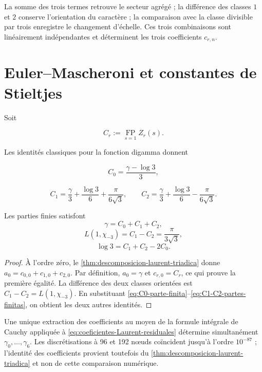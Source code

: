 La somme des trois termes retrouve le secteur agrégé ; la différence des
classes $1$ et $2$ conserve l'orientation du caractère ; la comparaison
avec la classe divisible par trois enregistre le changement d'échelle. Ces trois
combinaisons sont linéairement indépendantes et déterminent les trois
coefficients $c_{r,n}$.

\section{Euler--Mascheroni et constantes de Stieltjes}

Soit

\[
 C_r:=\operatorname*{FP}_{s=1}Z_r(s).
\]

Les identités classiques pour la fonction digamma donnent
\cite{Apostol1976,Lagarias2013}

\begin{equation}
 C_0=\frac{\gamma-\log3}{3},
 \label{eq:C0-parte-finita}
\end{equation}

\begin{equation}
 C_1=\frac\gamma3+\frac{\log3}{6}+\frac{\pi}{6\sqrt3},
 \qquad
 C_2=\frac\gamma3+\frac{\log3}{6}-\frac{\pi}{6\sqrt3}.
 \label{eq:C1-C2-partes-finitas}
\end{equation}

\begin{corollary}
\label{cor:gamma-log3-L1}
Les parties finies satisfont
\[
 \boxed{\gamma=C_0+C_1+C_2},
\]
\[
 \boxed{L(1,\chi_{-3})=C_1-C_2=\frac{\pi}{3\sqrt3}},
\]
\[
 \boxed{\log3=C_1+C_2-2C_0}.
\]
\end{corollary}

\begin{proof}
À l'ordre zéro, le \cref{thm:descomposicion-laurent-triadica} donne
$a_0=c_{0,0}+c_{1,0}+c_{2,0}$. Par définition,
$a_0=\gamma$ et $c_{r,0}=C_r$, ce qui prouve la première égalité. La
différence des deux classes orientées est
$C_1-C_2=L(1,\chi_{-3})$. En substituant
\eqref{eq:C0-parte-finita}--\eqref{eq:C1-C2-partes-finitas}, on obtient les
deux autres identités.
\end{proof}

Une unique extraction des coefficients au moyen de la formule intégrale de
Cauchy appliquée à \eqref{eq:coeficientes-Laurent-residuales} détermine
simultanément $\gamma_0,\ldots,\gamma_6$. Les discrétisations à 96 et
192 nœuds coïncident jusqu'à l'ordre $10^{-87}$ ; l'identité des
coefficients provient toutefois du
\cref{thm:descomposicion-laurent-triadica} et non de cette comparaison numérique.

